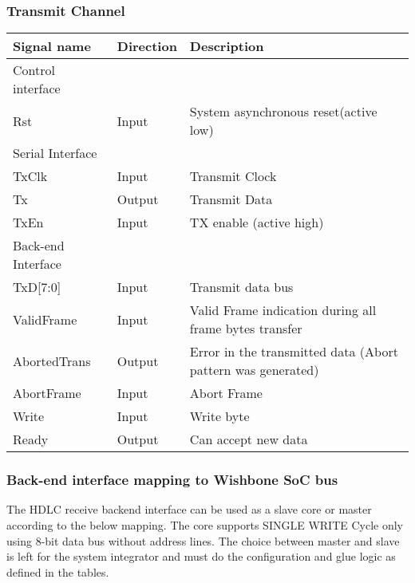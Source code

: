 \documentclass[a4paper,11pt]{article}
\begin{document}
\subsubsection{Transmit Channel}
\begin{tabular}{|l|l|l|}
\hline
Signal name& Direction& Description\\
\hline
\hline
Control interface & & \\
\hline
\hline
Rst & Input & System asynchronous reset(active low)\\
\hline
\hline
Serial Interface & & \\
\hline
\hline
TxClk & Input & Transmit Clock\\
Tx & Output & Transmit Data\\
TxEn & Input & TX enable (active high)\\
\hline
\hline
Back-end Interface & &\\
\hline
\hline
TxD[7:0]& Input & Transmit data bus\\
ValidFrame& Input& Valid Frame indication during all frame bytes transfer\\
AbortedTrans& Output& Error in the transmitted data (Abort pattern was generated)\\
AbortFrame& Input& Abort Frame\\
Write& Input& Write byte\\
Ready& Output& Can accept new data\\
\hline
\end{tabular}


\subsubsection{Back-end interface mapping to Wishbone SoC bus}
The HDLC receive backend interface can be used as a slave core or master according to the below mapping. The core supports SINGLE WRITE Cycle only using 8-bit data bus without address lines. The choice between master and slave is left for the system integrator and must do the configuration and glue logic as defined in the tables.
\end{document}
